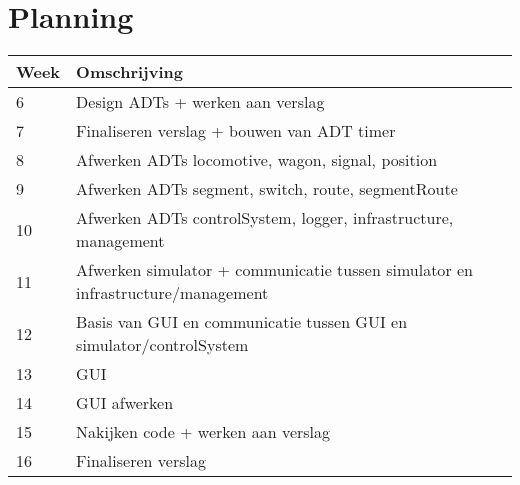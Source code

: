 \documentclass{article}
\begin{document}
\newpage

\section{Planning}
\begin{center}
    \begin{tabular}{ | l | l |}
    \hline
    Week & Omschrijving \\ \hline
    6 & Design ADTs + werken aan verslag \\ \hline
    7 & Finaliseren verslag + bouwen van ADT timer \\ \hline
    8 & Afwerken ADTs locomotive, wagon, signal, position \\ \hline
    9 & Afwerken ADTs segment, switch, route, segmentRoute \\ \hline
    10 & Afwerken ADTs controlSystem, logger, infrastructure, management \\ \hline
    11 & Afwerken simulator + communicatie tussen simulator en infrastructure/management \\ \hline
    12 & Basis van GUI en communicatie tussen GUI en simulator/controlSystem \\ \hline
    13 & GUI \\ \hline
    14 & GUI afwerken \\ \hline
    15 & Nakijken code + werken aan verslag \\ \hline
    16 & Finaliseren verslag \\ \hline
    \end{tabular}
\end{center}
\end{document}
